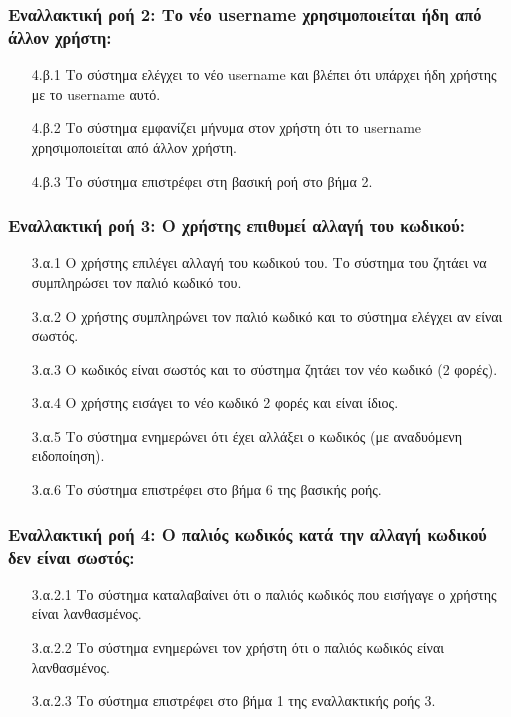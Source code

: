\documentclass[12pt,a4paper]{article}
\begin{document}
\subsubsection*{Εναλλακτική ροή 2: Το νέο username χρησιμοποιείται ήδη από άλλον χρήστη:}
\begin{enumerate}
    \item [4.β.1] Το σύστημα ελέγχει το νέο username και βλέπει ότι υπάρχει ήδη χρήστης με το username αυτό. 
    \item [4.β.2] Το σύστημα εμφανίζει μήνυμα στον χρήστη ότι το username χρησιμοποιείται από άλλον χρήστη.  
    \item [4.β.3] Το σύστημα επιστρέφει στη βασική ροή στο βήμα 2.
\end{enumerate}

\subsubsection*{Εναλλακτική ροή 3: Ο χρήστης επιθυμεί αλλαγή του κωδικού:}
\begin{enumerate}
    \item [3.α.1] Ο χρήστης επιλέγει αλλαγή του κωδικού του. Το σύστημα του ζητάει να συμπληρώσει τον παλιό κωδικό του.
    \item [3.α.2] Ο χρήστης συμπληρώνει τον παλιό κωδικό και το σύστημα ελέγχει αν είναι σωστός.
    \item [3.α.3] Ο κωδικός είναι σωστός και το σύστημα ζητάει τον νέο κωδικό (2 φορές).
    \item [3.α.4] Ο χρήστης εισάγει το νέο κωδικό 2 φορές και είναι ίδιος.
    \item [3.α.5] Το σύστημα ενημερώνει ότι έχει αλλάξει ο κωδικός (με αναδυόμενη ειδοποίηση).
    \item [3.α.6] Το σύστημα επιστρέφει στο βήμα 6 της βασικής ροής.
\end{enumerate}

\subsubsection*{Εναλλακτική ροή 4: Ο παλιός κωδικός κατά την αλλαγή κωδικού δεν είναι σωστός:}
\begin{enumerate}
    \item [3.α.2.1] Το σύστημα καταλαβαίνει ότι ο παλιός κωδικός που εισήγαγε ο χρήστης είναι λανθασμένος.
    \item [3.α.2.2] Το σύστημα ενημερώνει τον χρήστη ότι ο παλιός κωδικός είναι λανθασμένος.
    \item [3.α.2.3] Το σύστημα επιστρέφει στο βήμα 1 της εναλλακτικής ροής 3.
\end{enumerate}
\end{document}
